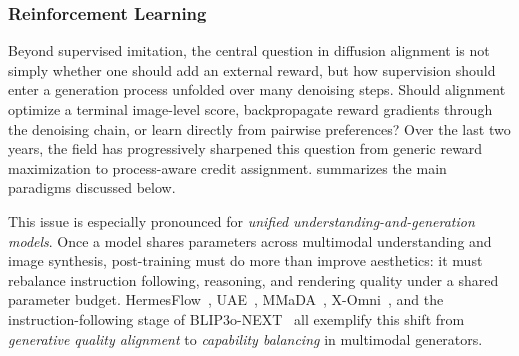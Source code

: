 \documentclass{llmxive}
\begin{document}
\subsubsection{Reinforcement Learning}
\label{subsubsec:pref_alignment}

Beyond supervised imitation, the central question in diffusion alignment is not simply whether one should add an external reward, but how supervision should enter a generation process unfolded over many denoising steps. Should alignment optimize a terminal image-level score, backpropagate reward gradients through the denoising chain, or learn directly from pairwise preferences? Over the last two years, the field has progressively sharpened this question from generic reward maximization to process-aware credit assignment.  summarizes the main paradigms discussed below.

This issue is especially pronounced for \emph{unified understanding-and-generation models}. Once a model shares parameters across multimodal understanding and image synthesis, post-training must do more than improve aesthetics: it must rebalance instruction following, reasoning, and rendering quality under a shared parameter budget. HermesFlow~\citep{yang2025hermesflow}, UAE~\citep{yan2025uae}, MMaDA~\citep{yang2025mmada}, X-Omni~\citep{geng2025xomni}, and the instruction-following stage of BLIP3o-NEXT~\citep{chen2025blip3onext} all exemplify this shift from \emph{generative quality alignment} to \emph{capability balancing} in multimodal generators.
\end{document}
